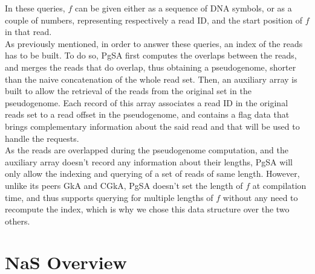 \documentclass{bioinfo}
\begin{document}
In these queries, $f$ can be given either as a sequence of DNA symbols, or as a couple of numbers, representing respectively a read ID, and the
start position of $f$ in that read. \\
\indent As previously mentioned, in order to answer these queries, an index of the reads has to be built. To do so, PgSA first computes the overlaps
between the reads, and merges the reads that do overlap, thus obtaining a pseudogenome, shorter than the naive concatenation of the whole read set. 
Then, an auxiliary array is built to allow the retrieval of the reads from the original set in the pseudogenome. Each record of this array  
associates a read ID in the original reads set to a read offset in the pseudogenome, and contains a flag data that brings complementary information about
the said read and that will be used to handle the requests. \\
\indent As the reads are overlapped during the pseudogenome computation, and the auxiliary array doesn't record any information about their lengths, PgSA will only allow the indexing and querying of a set of reads of same length. However, unlike its peers GkA and CGkA, PgSA doesn't set 
the length of $f$ at compilation time, and thus supports querying for multiple lengths of $f$ without any need to recompute the index, which is why
we chose this data structure over the two others. 


\section{NaS Overview}
\label{sec:NaSO}
\end{document}
